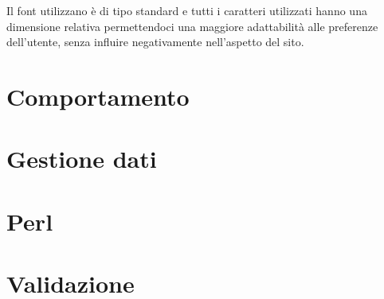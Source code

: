 \documentclass[11pt]{article}
\begin{document}
Il font utilizzano è di tipo standard e tutti i caratteri utilizzati hanno una dimensione relativa permettendoci una maggiore adattabilità alle preferenze dell'utente, senza influire negativamente nell'aspetto del sito.
\newpage
\section{Comportamento}
\newpage
\section{Gestione dati}
\newpage
\section{Perl}
\newpage
\section{Validazione}
\end{document}
